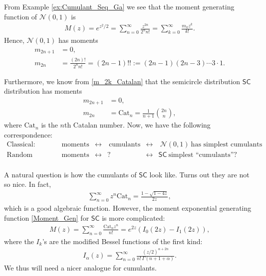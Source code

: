 \documentclass[letterpaper,11pt,oneside,reqno]{amsart}
\numberwithin{equation}{section}
\newcommand{\SC}{\mathsf{SC}}
\theoremstyle{definition}
\begin{document}
From Example \ref{ex:Cumulant_Seq_Ga} we see that 
the moment generating function of $\mathcal{N}(0,1)$ is 
\begin{align*}
    M(z)=e^{z^2/2}=\sum_{n=0}^\infty \frac{z^{2n}}{2^nn!}=\sum_{k=0}^\infty \frac{m_k z^k}{k!}.
\end{align*}
Hence, $\mathcal{N}(0,1)$ has moments
\begin{align*}
    m_{2n+1} &=0,\\
    m_{2n}& = \frac{(2n)!}{2^nn!}=(2n-1)!!:=(2n-1)(2n-3)\cdots 3\cdot 1.
\end{align*}

Furthermore, we know from \eqref{m_2k_Catalan} that the semicircle distribution $\SC$ distribution has moments 
\begin{align*}
    m_{2n+1} &=0,\\
    m_{2n}& = \mathrm{Cat}_n=\frac{1}{n+1} {{2n}\choose{n}},
\end{align*}
where $\mathrm{Cat}_n$ is the $n$th Catalan number.
Now, we have the following correspondence:
\begin{equation*}
\begin{array}{llclcl}
\text{Classical:} &  \text{moments} & \longleftrightarrow &\  \text{cumulants} &\longleftrightarrow & \ \mathcal{N}(0,1) \ \text{has simplest cumulants}\\
\text{Random matrices:} & \text{moments} & \longleftrightarrow & ? &\longleftrightarrow & \SC \ \text{simplest ``cumulants''?}\\
\end{array}	
\end{equation*}

A natural question is how the cumulants of $\SC$ look like. Turns out they are not so nice. In fact, 
\begin{align*}
    \sum_{n=0}^\infty z^n \text{Cat}_n=\frac{1-\sqrt{1-4z}}{2z},
\end{align*}
which is a good algebraic function. However, the moment exponential generating function
\eqref{Moment_Gen} 
for $\SC$ is more complicated:
\begin{align*}
    M(z)=\sum_{n=0}^\infty \frac{\text{Cat}_nz^n}{n!}=e^{2z}(I_0(2z)-I_1(2z)),
\end{align*}
where the $I_k$'s are the modified Bessel functions of the first kind:
\begin{align*}
    I_\alpha(z)=\sum_{n=0}^\infty \frac{(z/2)^{\alpha+2n}}{n!\,\Gamma(n+1+\alpha)}.
\end{align*}
We thus will need a nicer analogue for cumulants.
\end{document}
